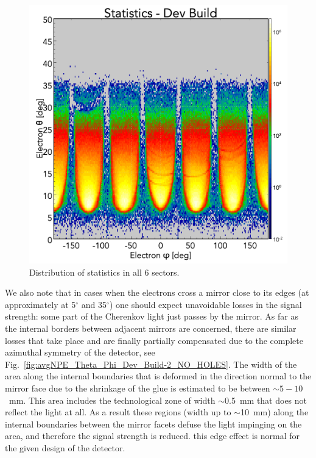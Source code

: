 \begin{figure}[!ht]
    \centering
    \includegraphics[width=1.0\linewidth,trim={0.0cm 0.0cm 0.0cm 1.67cm},clip]{images/statistics_Theta_Phi_Dev_Build_NO_HOLES.png}
    \caption{Distribution of statistics in all 6 sectors.}
    \label{fig:statistics_Theta_Phi_Dev_Build_NO_HOLES}
\end{figure}

We also note that in cases when the electrons cross a mirror close to its edges (at approximately at 5$^\circ$ and
35$^\circ$) one should expect unavoidable losses in the signal strength: some part of the Cherenkov light just passes
by the mirror. As far as the internal borders between adjacent mirrors are concerned, there are similar losses that
take place and are finally partially compensated due to the complete azimuthal symmetry of the detector, see
Fig.~\ref{fig:avgNPE_Theta_Phi_Dev_Build-2_NO_HOLES}. The width of the area along the internal boundaries that
is deformed in the direction normal to the mirror face due to the shrinkage of the glue is estimated to be between
$\sim 5 - 10$~mm. This area includes the technological zone of width $\sim$0.5~mm that does not reflect the light at
all. As a result these regions (width up to $\sim$10~mm) along the internal boundaries between the mirror facets
defuse the light impinging on the area, and therefore the signal strength is reduced. this edge effect is normal for
the given design of the detector.
